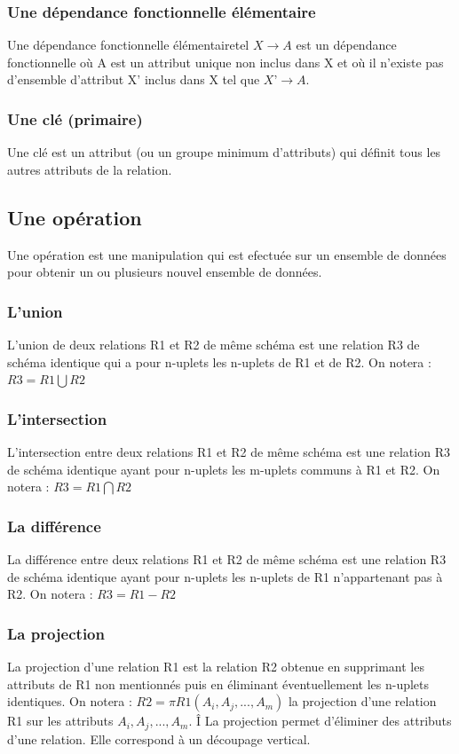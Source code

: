 \documentclass[12pt, a4paper, oneside, titlepage]{book}%
\begin{document}
\subsubsection{Une dépendance fonctionnelle élémentaire}
Une dépendance fonctionnelle élémentairetel $X \rightarrow A$ est un dépendance fonctionnelle où A est un attribut unique non inclus dans X et où il n’existe pas d'ensemble d'attribut X’ inclus dans X tel que $X’ \rightarrow A$.

\subsubsection{Une clé (primaire)}
Une clé est un attribut (ou un groupe minimum d'attributs) qui définit tous les autres attributs de la relation.

\subsection{Une opération}
Une opération est une manipulation qui est efectuée sur un ensemble de données pour obtenir un ou plusieurs nouvel ensemble de données.

\subsubsection{L'union}
L'union de deux relations R1 et R2 de même schéma est une relation R3 de schéma identique qui a pour n-uplets les n-uplets de R1 et de R2.
On notera : $R3 = R1 \bigcup R2$

\subsubsection{L'intersection}
L’intersection entre deux relations R1 et R2 de même schéma est une relation R3 de schéma identique ayant pour n-uplets les m-uplets communs à R1 et R2.
On notera : $R3 = R1 \bigcap R2$

\subsubsection{La différence}
La différence entre deux relations R1 et R2 de même schéma est une relation R3 de schéma identique ayant pour n-uplets les n-uplets de R1 n'appartenant pas à R2.
On notera : $R3 = R1 -  R2$

\subsubsection{La projection}
La projection d'une relation R1 est la relation R2 obtenue en supprimant les attributs de R1 non mentionnés puis en éliminant éventuellement les n-uplets identiques.
On notera : $R2 = \pi R1 (A_i, A_j, ... , A_m)$ la projection d'une relation R1 sur les attributs $A_i, A_j, ... , A_m$.
Î
 La projection permet d’éliminer des attributs d’une relation.  Elle correspond à un découpage vertical.
\end{document}
